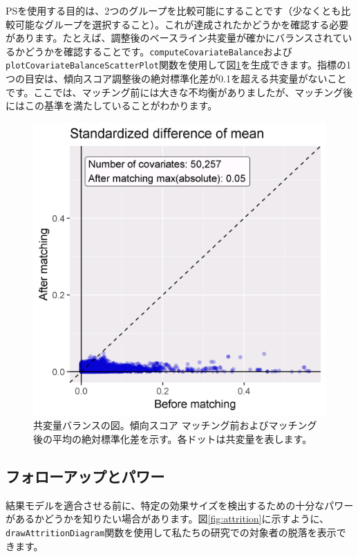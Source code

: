 \documentclass[
  11pt]{book}
\theoremstyle{definition}
\theoremstyle{definition}
\theoremstyle{definition}
\theoremstyle{definition}
\theoremstyle{remark}
\begin{document}
PSを使用する目的は、2つのグループを比較可能にすることです（少なくとも比較可能なグループを選択すること）。これが達成されたかどうかを確認する必要があります。たとえば、調整後のベースライン共変量が確かにバランスされているかどうかを確認することです。\texttt{computeCovariateBalance}および\texttt{plotCovariateBalanceScatterPlot}関数を使用して図\ref{fig:balance}を生成できます。指標の1つの目安は、傾向スコア調整後の絶対標準化差が0.1を超える共変量がないことです。ここでは、マッチング前には大きな不均衡がありましたが、マッチング後にはこの基準を満たしていることがわかります。 

\begin{figure}

{\centering \includegraphics[width=0.7\linewidth]{images/PopulationLevelEstimation/balance} 

}

\caption{共変量バランスの図。傾向スコア マッチング前およびマッチング後の平均の絶対標準化差を示す。各ドットは共変量を表します。}\label{fig:balance}
\end{figure}

\subsection{フォローアップとパワー}\label{ux30d5ux30a9ux30edux30fcux30a2ux30c3ux30d7ux3068ux30d1ux30efux30fc}

結果モデルを適合させる前に、特定の効果サイズを検出するための十分なパワーがあるかどうかを知りたい場合があります。図\ref{fig:attrition}に示すように、\texttt{drawAttritionDiagram}関数を使用して私たちの研究での対象者の脱落を表示できます。 
\end{document}
